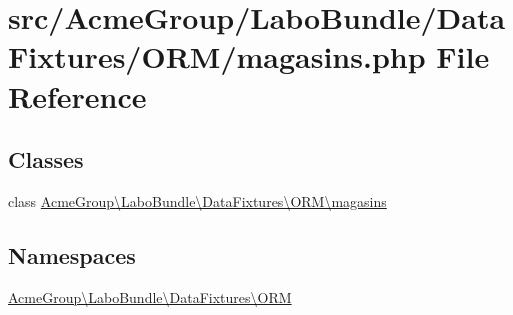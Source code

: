 \hypertarget{magasins_8php}{\section{src/\+Acme\+Group/\+Labo\+Bundle/\+Data\+Fixtures/\+O\+R\+M/magasins.php File Reference}
\label{magasins_8php}
}
\subsection*{Classes}
\begin{DoxyCompactItemize}
\item 
class \hyperlink{class_acme_group_1_1_labo_bundle_1_1_data_fixtures_1_1_o_r_m_1_1magasins}{Acme\+Group\textbackslash{}\+Labo\+Bundle\textbackslash{}\+Data\+Fixtures\textbackslash{}\+O\+R\+M\textbackslash{}magasins}
\end{DoxyCompactItemize}
\subsection*{Namespaces}
\begin{DoxyCompactItemize}
\item 
 \hyperlink{namespace_acme_group_1_1_labo_bundle_1_1_data_fixtures_1_1_o_r_m}{Acme\+Group\textbackslash{}\+Labo\+Bundle\textbackslash{}\+Data\+Fixtures\textbackslash{}\+O\+R\+M}
\end{DoxyCompactItemize}
